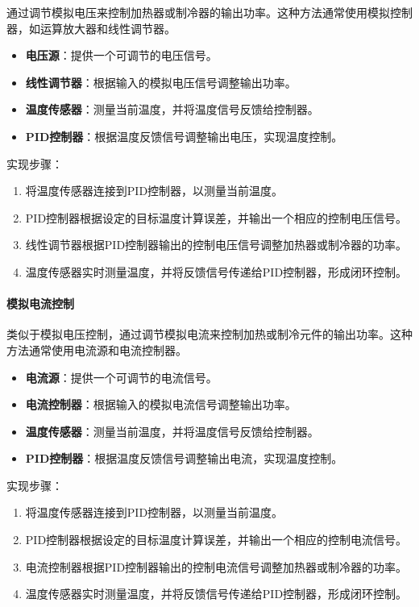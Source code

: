 \documentclass[dvipsnames, svgnames,a4paper,11pt]{article}
\begin{document}
通过调节模拟电压来控制加热器或制冷器的输出功率。这种方法通常使用模拟控制器，如运算放大器和线性调节器。

\begin{itemize}
    \item \textbf{电压源}：提供一个可调节的电压信号。
    \item \textbf{线性调节器}：根据输入的模拟电压信号调整输出功率。
    \item \textbf{温度传感器}：测量当前温度，并将温度信号反馈给控制器。
    \item \textbf{PID控制器}：根据温度反馈信号调整输出电压，实现温度控制。
\end{itemize}

实现步骤：

\begin{enumerate}
    \item 将温度传感器连接到PID控制器，以测量当前温度。
    \item PID控制器根据设定的目标温度计算误差，并输出一个相应的控制电压信号。
    \item 线性调节器根据PID控制器输出的控制电压信号调整加热器或制冷器的功率。
    \item 温度传感器实时测量温度，并将反馈信号传递给PID控制器，形成闭环控制。
\end{enumerate}



\paragraph*{模拟电流控制}

类似于模拟电压控制，通过调节模拟电流来控制加热或制冷元件的输出功率。这种方法通常使用电流源和电流控制器。

\begin{itemize}
    \item \textbf{电流源}：提供一个可调节的电流信号。
    \item \textbf{电流控制器}：根据输入的模拟电流信号调整输出功率。
    \item \textbf{温度传感器}：测量当前温度，并将温度信号反馈给控制器。
    \item \textbf{PID控制器}：根据温度反馈信号调整输出电流，实现温度控制。
\end{itemize}

实现步骤：

\begin{enumerate}
    \item 将温度传感器连接到PID控制器，以测量当前温度。
    \item PID控制器根据设定的目标温度计算误差，并输出一个相应的控制电流信号。
    \item 电流控制器根据PID控制器输出的控制电流信号调整加热器或制冷器的功率。
    \item 温度传感器实时测量温度，并将反馈信号传递给PID控制器，形成闭环控制。
\end{enumerate}
\end{document}
